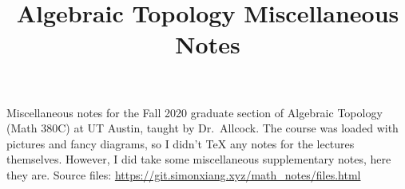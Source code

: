 \documentclass[9pt]{scrartcl}
\title{Algebraic Topology Miscellaneous Notes}
\begin{document}
\maketitle
Miscellaneous notes for the Fall 2020 graduate section of Algebraic Topology (Math 380C) at UT Austin, taught by Dr.\ Allcock. The course was loaded with pictures and fancy diagrams, so I didn't \TeX{} any notes for the lectures themselves. However, I did take some miscellaneous supplementary notes, here they are. Source files: \url{https://git.simonxiang.xyz/math_notes/files.html}
\tableofcontents
    
    
    
\end{document}
